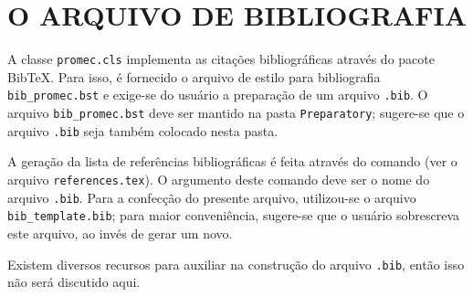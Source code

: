 \chapter{O ARQUIVO DE BIBLIOGRAFIA}\label{Cap:bib}
A classe \texttt{promec.cls} implementa as citações bibliográficas através do pacote Bib\TeX. Para isso, é fornecido o arquivo de estilo para bibliografia \texttt{bib\_promec.bst} e exige-se do usuário a preparação de um arquivo \texttt{.bib}. O arquivo \texttt{bib\_promec.bst} deve ser mantido na pasta \texttt{Preparatory}; sugere-se que o arquivo \texttt{.bib} seja também colocado nesta pasta.
    
A geração da lista de referências bibliográficas é feita através do comando \lstinline!! (ver o arquivo \texttt{references.tex}). O argumento deste comando deve ser o nome do arquivo \texttt{.bib}. Para a confecção do presente arquivo, utilizou-se o arquivo \texttt{bib\_template.bib}; para maior conveniência, sugere-se que o usuário sobrescreva este arquivo, ao invés de gerar um novo.
    
Existem diversos recursos para auxiliar na construção do arquivo \texttt{.bib}, então isso não será discutido aqui.